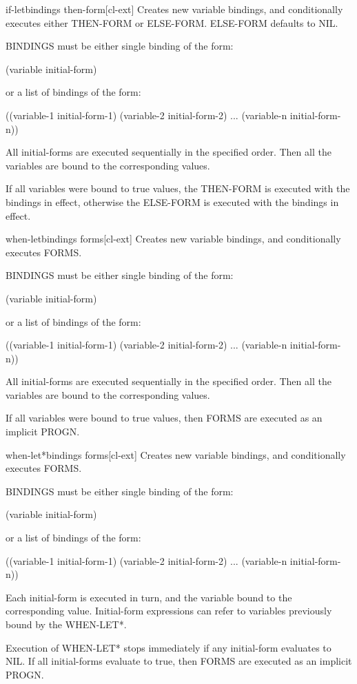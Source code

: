 \documentclass[10pt,english]{book}
\begin{document}
\begin{macro}{if-let}{bindings \body then-form}[cl-ext]
  Creates new variable bindings, and conditionally executes either
THEN-FORM or ELSE-FORM. ELSE-FORM defaults to NIL.

BINDINGS must be either single binding of the form:

 (variable initial-form)

or a list of bindings of the form:

 ((variable-1 initial-form-1)
  (variable-2 initial-form-2)
  ...
  (variable-n initial-form-n))

All initial-forms are executed sequentially in the specified order. Then all
the variables are bound to the corresponding values.

If all variables were bound to true values, the THEN-FORM is executed with the
bindings in effect, otherwise the ELSE-FORM is executed with the bindings in
effect.
\end{macro}

\begin{macro}{when-let}{bindings \body forms}[cl-ext]
  Creates new variable bindings, and conditionally executes FORMS.

BINDINGS must be either single binding of the form:

 (variable initial-form)

or a list of bindings of the form:

 ((variable-1 initial-form-1)
  (variable-2 initial-form-2)
  ...
  (variable-n initial-form-n))

All initial-forms are executed sequentially in the specified order. Then all
the variables are bound to the corresponding values.

If all variables were bound to true values, then FORMS are executed as an
implicit PROGN.
\end{macro}

\begin{macro}{when-let*}{bindings \body forms}[cl-ext]
  Creates new variable bindings, and conditionally executes FORMS.

BINDINGS must be either single binding of the form:

 (variable initial-form)

or a list of bindings of the form:

 ((variable-1 initial-form-1)
  (variable-2 initial-form-2)
  ...
  (variable-n initial-form-n))

Each initial-form is executed in turn, and the variable bound to the
corresponding value. Initial-form expressions can refer to variables
previously bound by the WHEN-LET*.

Execution of WHEN-LET* stops immediately if any initial-form evaluates to NIL.
If all initial-forms evaluate to true, then FORMS are executed as an implicit
PROGN.
\end{macro}
\end{document}
